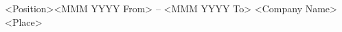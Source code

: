 \resumeSubheading
  {<Position>}{<MMM YYYY From> -- <MMM YYYY To>}
  {<Company Name>}{<Place>}
  \resumeItemListStart
    \resumeItem{}
    \resumeItem{}
    \resumeItem{}
  \resumeItemListEnd
